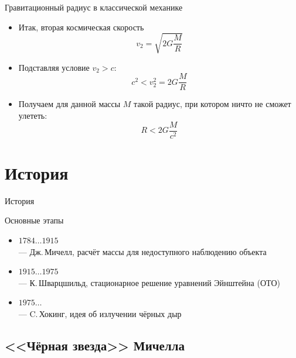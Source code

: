 \documentclass[usenames,dvipsnames,pdftex,unicode,hidelinks]{beamer}
\newcommand{\splashsection}[1]{
    \section{#1}
    \begin{frame}[plain]
      \begin{center}
        \huge #1
      \end{center}
    \end{frame}
  }
\begin{document}
  \begin{frame}{Гравитационный радиус в классической механике}
    \begin{itemize}
      \item<1-> Итак, вторая космическая скорость
        \[
          v_2 = \sqrt{2G\frac{M}{R}}
        \]
      \item<2-> Подставляя условие $v_2 > c$:
        \[
          c^2 < v_2^2 = 2G\frac{M}{R}
        \]
      \item<3-> Получаем для данной массы $M$ такой радиус, при котором ничто не сможет улететь:
        \[
          \boxed{
            R < 2G\frac{M}{c^2}
          }
        \]

    \end{itemize}
  \end{frame}

  \splashsection{История}

  \begin{frame}{Основные этапы}
    \begin{itemize}
      \item<1> $1784\dots1915$\\--- Дж.\,Мичелл, расчёт массы для недоступного наблюдению объекта 
      \item<2> $1915\dots1975$\\--- К.\,Шварцшильд, стационарное решение уравнений Эйнштейна (ОТО)
      \item<3> $1975\dots$\\--- C.\,Хокинг, идея об излучении чёрных дыр
    \end{itemize}
  \end{frame}

  \subsection{<<Чёрная звезда>> Мичелла}
    
\end{document}
